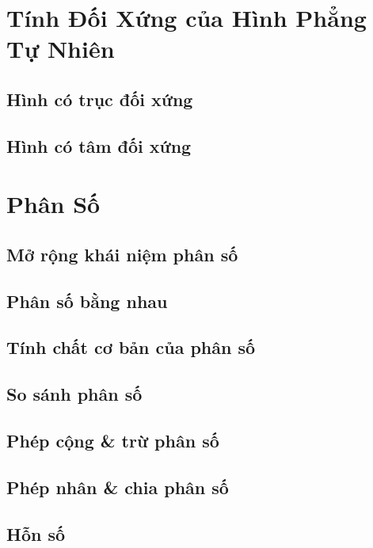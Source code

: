 \documentclass{article}
\numberwithin{equation}{section}
\begin{document}
\section{Tính Đối Xứng của Hình Phẳng Tự Nhiên}

\subsection{Hình có trục đối xứng}

\subsection{Hình có tâm đối xứng}


\section{Phân Số}

\subsection{Mở rộng khái niệm phân số}

\subsection{Phân số bằng nhau}

\subsection{Tính chất cơ bản của phân số}

\subsection{So sánh phân số}

\subsection{Phép cộng \& trừ phân số}

\subsection{Phép nhân \& chia phân số}

\subsection{Hỗn số}
\end{document}
